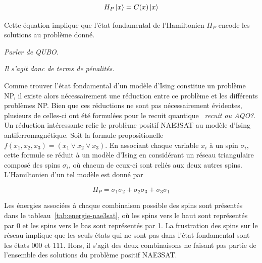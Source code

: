 \begin{equation}
    H_{P} \ket{x} = C(x) \ket{x}
\end{equation}

Cette équation implique que l'état fondamental de l'Hamiltonien $H_{P}$ encode les solutions au problème donné. 

\textcolor{mydarkred}{\textit{Parler de QUBO.}}

\textcolor{mydarkred}{\textit{Il s'agit donc de terms de pénalités.}}


Comme trouver l'état fondamental d'un modèle d'Ising constitue un problème NP, il existe alors nécessairement une réduction entre ce problème et les différents problèmes NP. Bien que ces réductions ne sont pas nécessairement évidentes, plusieurs de celles-ci ont été formulées pour le recuit quantique~\cite{lucasIsingFormulationsMany2014,lodewijksMappingNPhardNPcomplete2020} \textcolor{mydarkred}{\textit{recuit ou AQO?}}. Un réduction intéressante relie le problème positif NAE3SAT au modèle d'Ising antiferromagnétique. Soit la formule propositionelle $f(x_{1}, x_{2}, x_{3}) = (x_{1} \lor x_{2} \lor x_{3})$. En associant chaque variable $x_{i}$ à un spin $\sigma_{i}$, cette formule se réduit à un modèle d'Ising en considérant un réseau triangulaire composé des spins $\sigma_{i}$, où chacun de ceux-ci sont reliés aux deux autres spins. L'Hamiltonien d'un tel modèle est donné par

\begin{equation}
    H_{P} = \sigma_{1}\sigma_{2} + \sigma_{2}\sigma_{3} + \sigma_{3}\sigma_{1}
\end{equation}

Les énergies associées à chaque combinaison possible des spins sont présentés dans le tableau~\ref{tab:energie-nae3sat}, où les spins vers le haut sont représentés par 0 et les spins vers le bas sont représentés par 1. La frustration des spins sur le réseau implique que les seuls états qui ne sont pas dans l'état fondamental sont les états $000$ et $111$. Hors, il s'agit des deux combinaisons ne faisant pas partie de l'ensemble des solutions du problème positif NAE3SAT.


